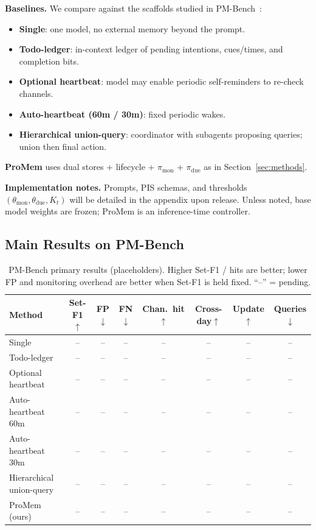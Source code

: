 \noindent\textbf{Baselines.}
We compare against the scaffolds studied in PM-Bench~\cite{pmbench2026}:
\begin{itemize}
    \item \textbf{Single}: one model, no external memory beyond the prompt.
    \item \textbf{Todo-ledger}: in-context ledger of pending intentions, cues/times, and completion bits.
    \item \textbf{Optional heartbeat}: model may enable periodic self-reminders to re-check channels.
    \item \textbf{Auto-heartbeat (60m / 30m)}: fixed periodic wakes.
    \item \textbf{Hierarchical union-query}: coordinator with subagents proposing queries; union then final action.
\end{itemize}
\textbf{ProMem} uses dual stores + lifecycle + $\pi_{\mathrm{mon}}$ + $\pi_{\mathrm{due}}$ as in Section~\ref{sec:methods}.

\noindent\textbf{Implementation notes.}
Prompts, PIS schemas, and thresholds $(\theta_{\mathrm{mon}},\theta_{\mathrm{due}},K_t)$ will be detailed in the appendix upon release. Unless noted, base model weights are frozen; ProMem is an inference-time controller.
\vspace{10pt}
\subsection{Main Results on PM-Bench}

\begin{table}[h]
\centering
\caption{PM-Bench primary results (placeholders). Higher Set-F1 / hits are better; lower FP and monitoring overhead are better when Set-F1 is held fixed. ``--'' = pending.}
\setlength{\tabcolsep}{3pt}
\label{tab:pmbench-main}
\begin{tabular}{l|ccccccc}
\toprule
\textbf{Method} & Set-F1$\uparrow$ & FP$\downarrow$ & FN$\downarrow$ & Chan.\ hit$\uparrow$ & Cross-day$\uparrow$ & Update$\uparrow$ & Queries$\downarrow$ \\
\midrule
Single & -- & -- & -- & -- & -- & -- & -- \\
Todo-ledger & -- & -- & -- & -- & -- & -- & -- \\
Optional heartbeat & -- & -- & -- & -- & -- & -- & -- \\
Auto-heartbeat 60m & -- & -- & -- & -- & -- & -- & -- \\
Auto-heartbeat 30m & -- & -- & -- & -- & -- & -- & -- \\
Hierarchical union-query & -- & -- & -- & -- & -- & -- & -- \\
\midrule
ProMem (ours) & -- & -- & -- & -- & -- & -- & -- \\
\bottomrule
\end{tabular}
\vspace{6pt}
\end{table}

